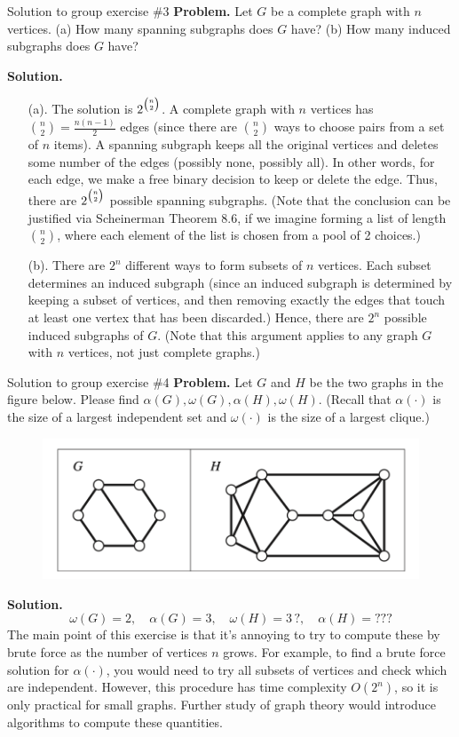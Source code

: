 \documentclass[10pt]{beamer}
\begin{document}
\begin{frame}{Solution to group exercise \#3}
\small 
\textbf{Problem.} Let $G$ be a complete graph with $n$ vertices.  (a) How many spanning subgraphs does $G$ have? (b) How many induced subgraphs does $G$ have?
\vfill

\textbf{Solution.}
\vspace{-.1cm}
\begin{itemize}
\item[(a).] The solution is $2^{\raisebox{0.3ex}{\scriptsize$\binom{n}{2}$}}$. A complete graph with $n$ vertices has $\binom{n}{2}=\frac{n(n-1)}{2}$ edges (since there are $\binom{n}{2}$ ways to choose pairs from a set of $n$ items).  A spanning subgraph keeps all the original vertices and deletes some number of the edges (possibly none, possibly all).  In other words, for each edge, we make a free binary decision to keep or delete the edge.  Thus, there are  $2^{\raisebox{0.3ex}{\scriptsize$\binom{n}{2}$}}$ possible spanning subgraphs.  (Note that the conclusion can be justified via Scheinerman Theorem 8.6, if we imagine forming a list of length $\binom{n}{2}$, where each element of the list is chosen from a pool of 2 choices.)
\item[(b).] There are $2^n$ different ways to form subsets of $n$ vertices.  Each subset determines an induced subgraph (since an induced subgraph is determined by keeping a subset of vertices, and then removing exactly the edges that touch at least one vertex that has been discarded.)  Hence, there are $2^n$ possible induced subgraphs of $G$. (Note that this argument applies to any graph $G$ with $n$ vertices, not just complete graphs.)
\end{itemize}

\end{frame}


\begin{frame}{Solution to group exercise \#4}
\small 
\textbf{Problem.}   Let $G$ and $H$ be the two graphs in the figure below.  Please find $\alpha(G), \omega(G), \alpha(H), \omega(H)$.  (Recall that $\alpha(\cdot)$ is the size of a largest independent set and $\omega(\cdot)$ is the size of a largest clique.) 
   
\begin{figure}
\includegraphics[width=.5\textwidth]{images/subgraph_2} %
\end{figure}
\vfill 
\textbf{Solution.}
%
\[ \omega(G)=2, \quad \alpha(G)=3, \quad  \omega(H)=3\,?, \quad  \alpha(H)=??? \]
%
The main point of this exercise is that it's annoying to try to compute these by brute force as the number of vertices $n$ grows. For example, to find a brute force solution for $\alpha(\cdot)$, you would need to try all subsets of vertices and check which are independent. However,  this procedure has time complexity $O(2^n)$, so it is only practical for small graphs.  Further study of graph theory would introduce algorithms to compute these quantities. 
\end{frame} 
\end{document}
